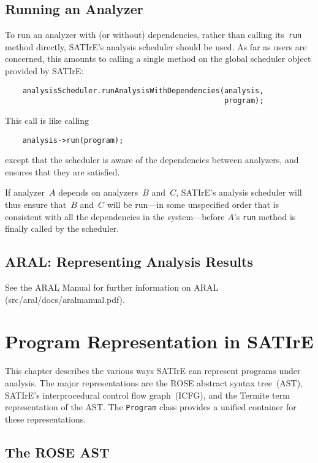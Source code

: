 \documentclass[a4paper,12pt]{report}
\begin{document}
\section{Running an Analyzer}
\label{sec:run_analyzer}

To run an analyzer with (or without) dependencies, rather than calling
its~\texttt{run} method directly, SATIrE's analysis scheduler should be
used. As far as users are concerned, this amounts to calling a single method
on the global scheduler object provided by SATIrE:
\begin{verbatim}
    analysisScheduler.runAnalysisWithDependencies(analysis,
                                                  program);
\end{verbatim}
This call is like calling
\begin{verbatim}
    analysis->run(program);
\end{verbatim}
except that the scheduler is aware of the dependencies between analyzers,
and ensures that they are satisfied.

If analyzer~\(A\) depends on analyzers~\(B\) and~\(C\), SATIrE's analysis
scheduler will thus ensure that~\(B\) and~\(C\) will be run---in some
unspecified order that is consistent with all the dependencies in the
system---before \(A\)'s \texttt{run} method is finally called by the
scheduler.

\section{ARAL: Representing Analysis Results}
\label{sec:aral}

See the ARAL Manual for further information on ARAL (src/aral/docs/aralmanual.pdf).

\chapter{Program Representation in SATIrE}
\label{chap:program_representation}

This chapter describes the various ways SATIrE can represent programs under
analysis. The major representations are the ROSE abstract syntax tree~(AST),
SATIrE's interprocedural control flow graph~(ICFG), and the Termite term
representation of the AST. The \texttt{Program} class provides a unified
container for these representations.

\section{The ROSE AST}
\label{sec:rose_ast}
\end{document}
